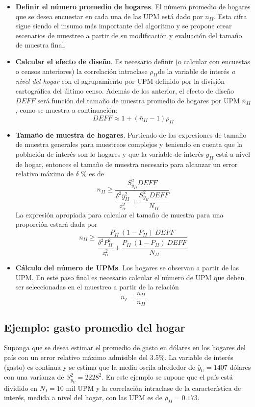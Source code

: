 \begin{itemize}
\item
  \textbf{Definir el número promedio de hogares}. El número promedio de hogares que se desea encuestar en cada una de las UPM está dado por \(\bar{n}_{II}\). Esta cifra sigue siendo el insumo más importante del algoritmo y se propone crear escenarios de muestreo a partir de su modificación y evaluación del tamaño de muestra final.
\item
  \textbf{Calcular el efecto de diseño}. Es necesario definir (o calcular con encuestas o censos anteriores) la correlación intraclase \(\rho_{II}\)de la variable de interés \emph{a nivel del hogar} con el agrupamiento por UPM definido por la división cartográfica del último censo. Además de los anterior, el efecto de diseño \(DEFF\) será función del tamaño de muestra promedio de hogares por UPM \(\bar{n}_{II}\), como se muestra a continuación:
  \[
  DEFF \approx 1 + (\bar{n}_{II} - 1)\rho_{II}
  \]
\item
  \textbf{Tamaño de muestra de hogares}. Partiendo de las expresiones de tamaño de muestra generales para muestreos complejos y teniendo en cuenta que la población de interés son lo hogares y que la variable de interés \(y_{II}\) está a nivel de hogar, entonces el tamaño de muestra necesario para alcanzar un error relativo máximo de \(\delta\) \% es de
  \[
  n_{II} \geq \dfrac{S^2_{y_{II}}DEFF}{\dfrac{\delta^2 \bar{y}_{II}^2}{z_{\alpha}^2}+\dfrac{S^2_{y_{II}}DEFF}{N_{II}}}
  \]
  La expresión apropiada para calcular el tamaño de muestra para una proporción estará dada por
  \[
  n_{II} \geq \dfrac{P_{II}\ (1-P_{II})\ DEFF}{\dfrac{\delta^2P^2_{II}}{z_{\alpha}^2 }+\dfrac{P_{II}\ (1-P_{II}) \ DEFF}{N_{II}}}
  \]
\item
  \textbf{Cálculo del número de UPMs}. Los hogares se observan a partir de las UPM. En este paso final es necesario calcular el número de UPM que deben ser seleccionadas en el muestreo a partir de la relación
  \[
  n_{I} = \frac{n_{II}}{\bar{n}_{II}}
  \]
\end{itemize}

\hypertarget{ejemplo-gasto-promedio-del-hogar}{%
\subsection{Ejemplo: gasto promedio del hogar}\label{ejemplo-gasto-promedio-del-hogar}}

Suponga que se desea estimar el promedio de gasto en dólares en los hogares del país con un error relativo máximo admisible del 3.5\%. La variable de interés (gasto) es continua y se estima que la media oscila alrededor de \(\bar{y}_U=1407\) dólares con una varianza de \(S^2_{y_U}=2228^2\). En este ejemplo se supone que el país está dividido en \(N_I = 10\) mil UPM y la correlación intraclase de la característica de interés, medida a nivel del hogar, con las UPM es de \(\rho_{II} = 0.173\).

